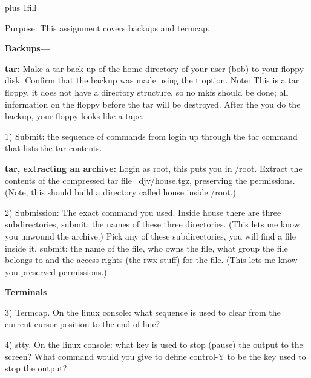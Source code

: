 
\rightskip=0pt plus 1fill

\parindent 0pt

Purpose: This assignment covers backups and termcap.

{\bf Backups---}

{\bf tar:}
Make a tar back up of the home directory of your user (bob) to your floppy
disk.
Confirm that the backup was made using the {\ltt{}t} option.
Note: This is a tar floppy, it does not have a directory structure,
so no mkfs should be done; all information on the floppy before
the tar will be destroyed. After the you do the backup, your
floppy looks like a tape.

1) Submit: the sequence of commands from login up through the
tar command that lists the tar contents.

{\bf tar, extracting an archive:}
Login as root, this puts you in {\ltt{}/root}.
Extract the contents of the compressed tar file {\ltt{}~djv/house.tgz},
preserving the permissions.
(Note, this should build a directory called {\ltt{}house} inside {\ltt{}/root}.)

2) Submission: The exact command you used.
Inside {\ltt{}house} there are three subdirectories, submit: the names of
these three directories. (This lets me know you unwound the archive.)
Pick any of these subdirectories, you will find a file inside it,
submit: the name of the file, who owns the file, what group the file
belongs to and the access rights (the {\ltt{}rwx} stuff) for the file.
(This lets me know you preserved permissions.)

{\bf Terminals---}

3) Termcap.
On the linux console: what sequence is used to clear from the current
cursor position to the end of line?

4) stty.
On the linux console: what key is used to stop (pause) the output to the
screen?
What command would you give to define control-Y to be the key used
to stop the output?

\bye
